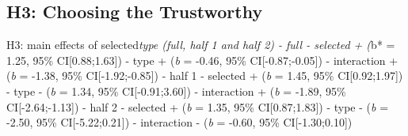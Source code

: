 \documentclass[man]{apa6}
\begin{document}
\hypertarget{h3-choosing-the-trustworthy}{%
\subsection{H3: Choosing the
Trustworthy}\label{h3-choosing-the-trustworthy}}

H3: main effects of selected\emph{type (full, half 1 and half 2) - full
- selected + (}b* = 1.25, 95\% CI{[}0.88;1.63{]}) - type + (\emph{b} =
-0.46, 95\% CI{[}-0.87;-0.05{]}) - interaction + (\emph{b} = -1.38, 95\%
CI{[}-1.92;-0.85{]}) - half 1 - selected + (\emph{b} = 1.45, 95\%
CI{[}0.92;1.97{]}) - type - (\emph{b} = 1.34, 95\% CI{[}-0.91;3.60{]}) -
interaction + (\emph{b} = -1.89, 95\% CI{[}-2.64;-1.13{]}) - half 2 -
selected + (\emph{b} = 1.35, 95\% CI{[}0.87;1.83{]}) - type - (\emph{b}
= -2.50, 95\% CI{[}-5.22;0.21{]}) - interaction - (\emph{b} = -0.60,
95\% CI{[}-1.30;0.10{]})
\end{document}
